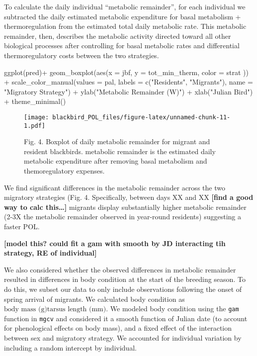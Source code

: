 \documentclass[
]{article}
\newenvironment{Shaded}{\begin{snugshade}}{\end{snugshade}}
\newcommand{\AttributeTok}[1]{\textcolor[rgb]{0.77,0.63,0.00}{#1}}
\newcommand{\FunctionTok}[1]{\textcolor[rgb]{0.00,0.00,0.00}{#1}}
\newcommand{\NormalTok}[1]{#1}
\newcommand{\SpecialCharTok}[1]{\textcolor[rgb]{0.00,0.00,0.00}{#1}}
\newcommand{\StringTok}[1]{\textcolor[rgb]{0.31,0.60,0.02}{#1}}
\begin{document}
To calculate the daily individual ``metabolic remainder'', for each
individual we subtracted the daily estimated metabolic expenditure for
basal metabolism + thermoregulation from the estimated total daily
metabolic rate. This metabolic remainder, then, describes the metabolic
activity directed toward all other biological processes after
controlling for basal metabolic rates and differential thermoregulatory
costs between the two strategies.

\begin{Shaded}
\begin{Highlighting}[]
\FunctionTok{ggplot}\NormalTok{(pred)}\SpecialCharTok{+}
  \FunctionTok{geom\_boxplot}\NormalTok{(}\FunctionTok{aes}\NormalTok{(}\AttributeTok{x =}\NormalTok{ jbf, }\AttributeTok{y =}\NormalTok{ tot\_min\_therm, }\AttributeTok{color =}\NormalTok{ strat )) }\SpecialCharTok{+}
  \FunctionTok{scale\_color\_manual}\NormalTok{(}\AttributeTok{values =}\NormalTok{ pal, }\AttributeTok{labels =} \FunctionTok{c}\NormalTok{(}\StringTok{"Residents"}\NormalTok{, }\StringTok{"Migrants"}\NormalTok{),}
                     \AttributeTok{name =} \StringTok{"Migratory Strategy"}\NormalTok{) }\SpecialCharTok{+}
  \FunctionTok{ylab}\NormalTok{(}\StringTok{"Metabolic Remainder (W)"}\NormalTok{) }\SpecialCharTok{+}
  \FunctionTok{xlab}\NormalTok{(}\StringTok{"Julian Bird"}\NormalTok{) }\SpecialCharTok{+}
  \FunctionTok{theme\_minimal}\NormalTok{()}
\end{Highlighting}
\end{Shaded}

\begin{figure}
\centering
\texttt{[image: blackbird\_POL\_files/figure-latex/unnamed-chunk-11-1.pdf]}
\caption{Fig. 4. Boxplot of daily metabolic remainder for migrant and
resident blackbirds. metabolic remainder is the estimated daily
metabolic expenditure after removing basal metabolism and
themoregulatory expenses.}
\end{figure}

We find significant differences in the metabolic remainder across the
two migratory strategies (Fig. 4. Specifically, between days XX and XX
\textbf{{[}find a good way to calc this\ldots{]}} migrants display
substantially higher metabolic remainder (2-3X the metabolic remainder
observed in year-round residents) suggesting a faster POL.

\textbf{{[}model this? could fit a gam with smooth by JD interacting tih
strategy, RE of individual{]}}

We also considered whether the observed differences in metabolic
remainder resulted in differences in body condition at the start of the
breeding season. To do this, we subset our data to only include
observations following the onset of spring arrival of migrants. We
calculated body condition as
\(\text{body mass (g)}\text{tarsus length (mm)}\). We modeled body
condition using the \texttt{gam} function in \texttt{mgcv} and
considered it a smooth function of Julian date (to account for
phenological effects on body mass), and a fixed effect of the
interaction between sex and migratory strategy. We accounted for
individual variation by including a random intercept by individual.
\end{document}
